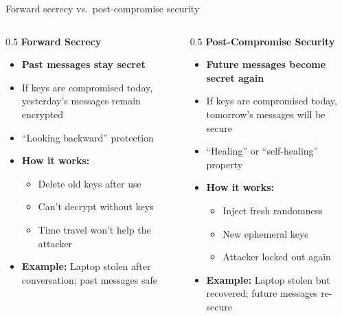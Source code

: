 \ifdefined\PRESENTATION\else\PassOptionsToClass{handout}{beamer}\fi\documentclass[aspectratio=169, lualatex]{beamer}
\begin{document}
\begin{frame}{Forward secrecy vs.\ post-compromise security}
	\begin{columns}
		\begin{column}{0.5\textwidth}
			\textbf{Forward Secrecy}
			\begin{itemize}
				\item \textbf{Past messages stay secret}
				\item If keys are compromised today, yesterday's messages remain encrypted
				\item ``Looking backward'' protection
				\item \textbf{How it works:}
				      \begin{itemize}
					      \item Delete old keys after use
					      \item Can't decrypt without keys
					      \item Time travel won't help the attacker
				      \end{itemize}
				\item \textbf{Example:} Laptop stolen after conversation; past messages safe
			\end{itemize}
		\end{column}
		\begin{column}{0.5\textwidth}
			\textbf{Post-Compromise Security}
			\begin{itemize}
				\item \textbf{Future messages become secret again}
				\item If keys are compromised today, tomorrow's messages will be secure
				\item ``Healing'' or ``self-healing'' property
				\item \textbf{How it works:}
				      \begin{itemize}
					      \item Inject fresh randomness
					      \item New ephemeral keys
					      \item Attacker locked out again
				      \end{itemize}
				\item \textbf{Example:} Laptop stolen but recovered; future messages re-secure
			\end{itemize}
		\end{column}
	\end{columns}
\end{frame}
\end{document}
